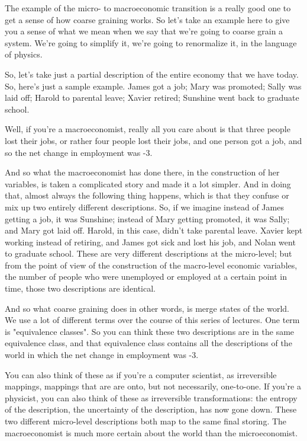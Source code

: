 \documentclass[]{article}
\begin{document}
The example of the micro-
to macroeconomic transition
is a really good one to get
a sense of how coarse graining works.
So let's take an example here
to give you a sense of what we mean
when we say that we're going
to coarse grain a system.
We're going to simplify it,
we're going to renormalize it,
in the language of physics.

So, let's take just a partial description
of the entire economy that we have today.
So, here's just a sample example.
James got a job; Mary was promoted;
Sally was laid off;
Harold to parental leave; Xavier retired;
Sunshine went back to graduate school.

Well, if you're a macroeconomist,
really all you care about
is that three people lost their jobs,
or rather four people lost their jobs,
and one person got a job,
and so the net change
in employment was -3.

And so what the macroeconomist
has done there,
in the construction of her variables,
is taken a complicated story
and made it a lot simpler.
And in doing that, almost always
the following thing happens,
which is that they confuse or mix up
two entirely different descriptions.
So, if we imagine instead of
James getting a job, it was Sunshine;
instead of Mary
getting promoted, it was Sally;
and Mary got laid off.
Harold, in this case,
didn't take parental leave.
Xavier kept working instead of retiring,
and James got sick and lost his job,
and Nolan went to graduate school.
These are very different descriptions
at the micro-level;
but from the point of view
of the construction
of the macro-level economic variables,
the number of people
who were unemployed or employed
at a certain point in time,
those two descriptions are identical.

And so what coarse graining
does in other words,
is merge states of the world.
We use a lot of different terms
over the course
of this series of lectures.
One term is "equivalence classes".
So you can think these two descriptions
are in the same 
equivalence class,
and that equivalence class
contains all the descriptions of the world
in which the net change
in employment was -3.

You can also think of these
as if you're a computer scientist,
as irreversible mappings,
mappings that are are onto,
but not necessarily, one-to-one.
If you're a physicist, 
you can also think of these
as irreversible transformations:
the entropy of the description,
the uncertainty of the description,
has now gone down.
These two different
micro-level descriptions
both map to the same final storing.
The macroeconomist is much more certain
about the world than the microeconomist.
\end{document}

